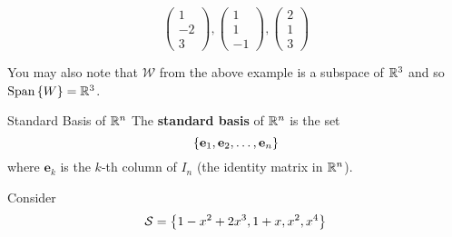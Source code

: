 \begin{example}{}{}
\begin{solution}
\[{\begin{pmatrix}
                    1 \\ -2 \\ 3
                \end{pmatrix},
                \begin{pmatrix}
                    1 \\ 1 \\ -1
                \end{pmatrix},
                \begin{pmatrix}
                    2 \\ 1 \\ 3
                \end{pmatrix}
            }
        \]
    \end{solution}
\end{example}

You may also note that $\mathcal{W}$ from the above example is a subspace of $\mathbb R^{3}$ and so $\text{Span}\left\{W \right\} = \mathbb R^3$.

\begin{defbox}{Standard Basis of $\mathbb R^{n}$}{}
    The \textbf{standard basis} of $\mathbb R^{n}$ is the set 
    \[
        \left\{\mathbf{e}_1, \mathbf{e}_2, \ldots, \mathbf{e}_n \right\} 
    \]
    where $\mathbf{e}_k$ is the $k$-th column of $I_n$ (the identity matrix in $\mathbb R^{n}$).
\end{defbox}

\begin{example}{}{}
    Consider 
    \[
        \mathcal{S} = \left\{1 - x^2 + 2x^3, 1 + x, x^2, x^4 \right\} 
    \] 
\end{example}

